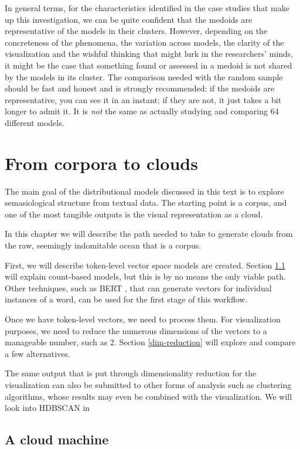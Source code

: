\documentclass[
]{book}
\begin{document}
In general terms, for the characteristics identified in the case studies that make up this
investigation, we can be quite confident that the medoids are representative of the models in
their clusters. However, depending on the concreteness of the phenomena, the variation across
models, the clarity of the visualization and the wishful thinking that might lurk in the
researchers' minds, it might be the case that something found or assessed in a medoid is not
shared by the models in its cluster. The comparison needed with the random sample should be
fast and honest and is strongly recommended: if the medoids are representative, you can see it
in an instant; if they are not, it just takes a bit longer to admit it. It is \emph{not} the same as actually studying and comparing 64 different models.

\hypertarget{from-corpora-to-clouds}{%
\chapter{From corpora to clouds}\label{from-corpora-to-clouds}}

The main goal of the distributional models discussed in this text is to explore semasiological structure
from textual data. The starting point is a corpus, and one of the most tangible outputs is the visual representation
as a cloud.

In this chapter we will describe the path needed to take to generate clouds from the raw,
seemingly indomitable ocean that is a corpus.

First, we will describe token-level vector space models are created.
Section \ref{vector-creation} will explain count-based models, but this is by no means the only viable path.
Other techniques, such as BERT \autocite{BERT}, that can generate vectors for individual instances of a word,
can be used for the first stage of this workflow.

Once we have token-level vectors, we need to process them. For visualization purposes,
we need to reduce the numerous dimensions of the vectors to a manageable number, such as 2.
Section \ref{dim-reduction} will explore and compare a few alternatives.

The same output that is put through dimensionality reduction for the visualization can also
be submitted to other forms of analysis such as clustering algorithms, whose results may
even be combined with the visualization. We will look into HDBSCAN in

\hypertarget{vector-creation}{%
\section{A cloud machine}\label{vector-creation}}
\end{document}
